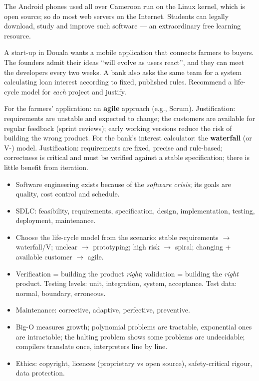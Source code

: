 \documentclass[11pt]{article}
\begin{document}
\begin{savaistu}
The Android phones used all over Cameroon run on the Linux kernel, which is open source; so do most web servers on the Internet. Students can legally download, study and improve such software — an extraordinary free learning resource.
\end{savaistu}

\begin{exercice}
A start-up in Douala wants a mobile application that connects farmers to buyers. The founders admit their ideas ``will evolve as users react'', and they can meet the developers every two weeks. A bank also asks the same team for a system calculating loan interest according to fixed, published rules. Recommend a life-cycle model for \emph{each} project and justify.
\end{exercice}

\begin{corrige}[Exercise 1]
For the farmers' application: an \textbf{agile} approach (e.g., Scrum). Justification: requirements are unstable and expected to change; the customers are available for regular feedback (sprint reviews); early working versions reduce the risk of building the wrong product. For the bank's interest calculator: the \textbf{waterfall} (or V-) model. Justification: requirements are fixed, precise and rule-based; correctness is critical and must be verified against a stable specification; there is little benefit from iteration.
\end{corrige}

\begin{aretenir}
\begin{itemize}
\item Software engineering exists because of the \emph{software crisis}; its goals are quality, cost control and schedule.
\item SDLC: feasibility, requirements, specification, design, implementation, testing, deployment, maintenance.
\item Choose the life-cycle model from the scenario: stable requirements $\to$ waterfall/V; unclear $\to$ prototyping; high risk $\to$ spiral; changing + available customer $\to$ agile.
\item Verification = building the product \emph{right}; validation = building the \emph{right} product. Testing levels: unit, integration, system, acceptance. Test data: normal, boundary, erroneous.
\item Maintenance: corrective, adaptive, perfective, preventive.
\item Big-O measures growth; polynomial problems are tractable, exponential ones are intractable; the halting problem shows some problems are undecidable; compilers translate once, interpreters line by line.
\item Ethics: copyright, licences (proprietary vs open source), safety-critical rigour, data protection.
\end{itemize}
\end{aretenir}
\end{document}
